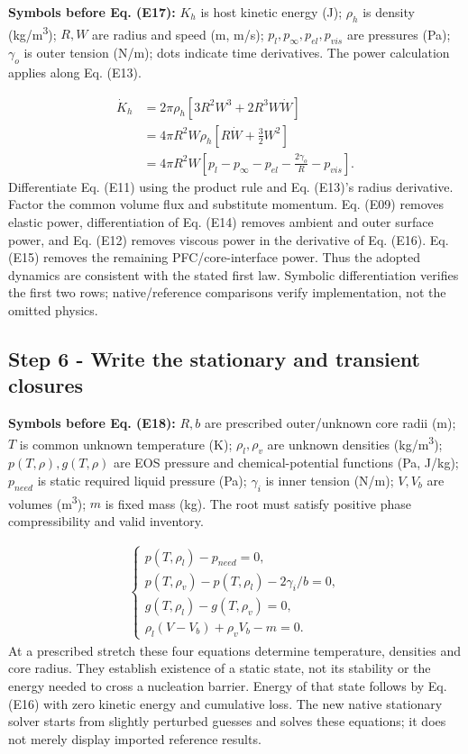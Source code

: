 \documentclass[10pt,a4paper]{article}
\begin{document}
\textbf{Symbols before Eq. (E17):} $K_h$ is host kinetic energy (J); $\rho_h$ is density (kg/m\textsuperscript{3}); $R,W$ are radius and speed (m, m/s); $p_l,p_\infty,p_{el},p_{vis}$ are pressures (Pa); $\gamma_o$ is outer tension (N/m); dots indicate time derivatives. The power calculation applies along Eq. (E13).

{\small\begin{align*}
\dot K_h&=2\pi\rho_h[3R^2W^3+2R^3W\dot W]\\
&=4\pi R^2W\rho_h\left[R\dot W+\frac32W^2\right]\\
&=4\pi R^2W\left[p_l-p_\infty-p_{el}-\frac{2\gamma_o}{R}-p_{vis}\right]. \tag{E17}
\end{align*}}
Differentiate Eq. (E11) using the product rule and Eq. (E13)'s radius derivative. Factor the common volume flux and substitute momentum. Eq. (E09) removes elastic power, differentiation of Eq. (E14) removes ambient and outer surface power, and Eq. (E12) removes viscous power in the derivative of Eq. (E16). Eq. (E15) removes the remaining PFC/core-interface power. Thus the adopted dynamics are consistent with the stated first law. Symbolic differentiation verifies the first two rows; native/reference comparisons verify implementation, not the omitted physics.

\subsection*{Step 6  -  Write the stationary and transient closures}
\textbf{Symbols before Eq. (E18):} $R,b$ are prescribed outer/unknown core radii (m); $T$ is common unknown temperature (K); $\rho_l,\rho_v$ are unknown densities (kg/m\textsuperscript{3}); $p(T,\rho),g(T,\rho)$ are EOS pressure and chemical-potential functions (Pa, J/kg); $p_{need}$ is static required liquid pressure (Pa); $\gamma_i$ is inner tension (N/m); $V,V_b$ are volumes (m\textsuperscript{3}); $m$ is fixed mass (kg). The root must satisfy positive phase compressibility and valid inventory.

{\small\begin{align*}
\begin{cases}
p(T,\rho_l)-p_{need}=0,\\
p(T,\rho_v)-p(T,\rho_l)-2\gamma_i/b=0,\\
g(T,\rho_l)-g(T,\rho_v)=0,\\
\rho_l(V-V_b)+\rho_vV_b-m=0.
\end{cases} \tag{E18}
\end{align*}}
At a prescribed stretch these four equations determine temperature, densities and core radius. They establish existence of a static state, not its stability or the energy needed to cross a nucleation barrier. Energy of that state follows by Eq. (E16) with zero kinetic energy and cumulative loss. The new native stationary solver starts from slightly perturbed guesses and solves these equations; it does not merely display imported reference results.
\end{document}
